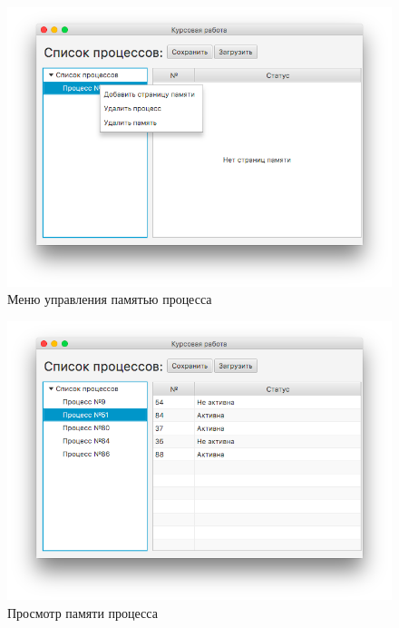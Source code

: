 \documentclass[russian,utf8,simple,hpadding=10mm,vpadding=20mm]{eskdtext}
\begin{document}
\begin{figure}[!h]
    \centering
    \includegraphics[width=1\textwidth]{screenshots/3.png}
    \caption{Меню управления памятью процесса}
    \label{fig:mesh3}
\end{figure}
\begin{figure}[!h]
    \centering
    \includegraphics[width=1\textwidth]{screenshots/4.png}
    \caption{Просмотр памяти процесса}
    \label{fig:mesh4}
\end{figure}
\end{document}
